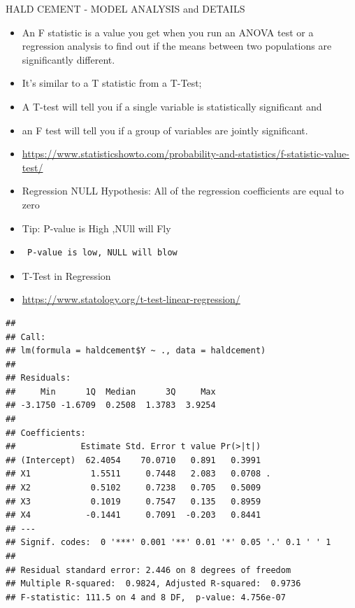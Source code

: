 \documentclass[
  ignorenonframetext,
]{beamer}
\begin{document}
\begin{frame}[fragile]{HALD CEMENT - MODEL ANALYSIS and DETAILS}
\protect\hypertarget{hald-cement---model-analysis-and-details}{}
\begin{itemize}
\item
  An F statistic is a value you get when you run an ANOVA test or a
  regression analysis to find out if the means between two populations
  are significantly different.
\item
  It's similar to a T statistic from a T-Test;
\item
  A T-test will tell you if a single variable is statistically
  significant and
\item
  an F test will tell you if a group of variables are jointly
  significant.
\item
  \url{https://www.statisticshowto.com/probability-and-statistics/f-statistic-value-test/}
\item
  Regression NULL Hypothesis: All of the regression coefficients are
  equal to zero
\item
  Tip: P-value is High ,NUll will Fly
\item
\begin{verbatim}
 P-value is low, NULL will blow
\end{verbatim}
\item
  T-Test in Regression
\item
  \url{https://www.statology.org/t-test-linear-regression/}
\end{itemize}

\begin{verbatim}
## 
## Call:
## lm(formula = haldcement$Y ~ ., data = haldcement)
## 
## Residuals:
##     Min      1Q  Median      3Q     Max 
## -3.1750 -1.6709  0.2508  1.3783  3.9254 
## 
## Coefficients:
##             Estimate Std. Error t value Pr(>|t|)  
## (Intercept)  62.4054    70.0710   0.891   0.3991  
## X1            1.5511     0.7448   2.083   0.0708 .
## X2            0.5102     0.7238   0.705   0.5009  
## X3            0.1019     0.7547   0.135   0.8959  
## X4           -0.1441     0.7091  -0.203   0.8441  
## ---
## Signif. codes:  0 '***' 0.001 '**' 0.01 '*' 0.05 '.' 0.1 ' ' 1
## 
## Residual standard error: 2.446 on 8 degrees of freedom
## Multiple R-squared:  0.9824, Adjusted R-squared:  0.9736 
## F-statistic: 111.5 on 4 and 8 DF,  p-value: 4.756e-07
\end{verbatim}
\end{frame}
\end{document}
